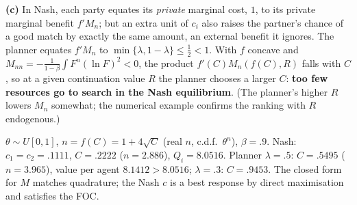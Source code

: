 \documentclass[12pt, letterpaper]{article}
\begin{document}
\begin{tcolorbox}[evenbox,title={Exercise 6.6 \quad Mortensen Externality}]
\textbf{(c)} In Nash, each party equates its \emph{private} marginal cost, $1$, to its private marginal benefit
$f'M_n$; but an extra unit of $c_i$ also raises the partner's chance of a good match by exactly the same
amount, an external benefit it ignores. The planner equates $f'M_n$ to $\min\{\lambda,1-\lambda\}\le\frac12<1$. With $f$
concave and $M_{nn}=-\frac{1}{1-\beta}\int F^n(\ln F)^2<0$, the product $f'(C)M_n(f(C),R)$ falls with $C$, so at a
given continuation value $R$ the planner chooses a larger $C$: \textbf{too few resources go to search in
the Nash equilibrium}. (The planner's higher $R$ lowers $M_n$ somewhat; the numerical example confirms
the ranking with $R$ endogenous.)

\begin{tcolorbox}[databox]
$\theta\sim U[0,1]$, $n=f(C)=1+4\sqrt C$ (real $n$, c.d.f.\ $\theta^n$), $\beta=.9$. Nash: $c_1=c_2=.1111$, $C=.2222$
($n=2.886$), $Q_i=8.0516$. Planner $\lambda=.5$: $C=.5495$ ($n=3.965$), value per agent $8.1412>8.0516$; $\lambda=.3$:
$C=.9453$. The closed form for $M$ matches quadrature; the Nash $c$ is a best response by direct
maximisation and satisfies the FOC.
\end{tcolorbox}
\end{tcolorbox}
\end{document}
